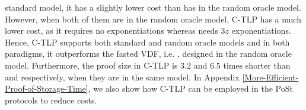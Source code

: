standard model, it has a slightly lower cost than \cite{Wesolowski19} has in the random oracle model. However, when both of them are in the random oracle model, C-TLP   has a much lower cost, as it requires no exponentiations whereas  \cite{Wesolowski19} needs $3z$ exponentiations.  Hence,  C-TLP   supports both standard and random oracle models and in both paradigms, it outperforms the fasted VDF, i.e. \cite{Wesolowski19}, designed in the random oracle model. Furthermore, the  proof size in C-TLP  is $3.2$ and $6.5$ times shorter than \cite{BonehBBF18} and  \cite{Wesolowski19} respectively, when they are in the same model.  In Appendix \ref{More-Efficient-Proof-of-Storage-Time},  we also show how C-TLP can be employed in the PoSt protocols \cite{Storage-Time} to reduce costs. 


%




